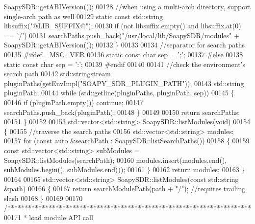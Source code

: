 \begin{DoxyCode}
{      SoapySDR::getABIVersion());
00128         \textcolor{comment}{//when using a multi-arch directory, support single-arch path as well}
00129         \textcolor{keyword}{static} \textcolor{keyword}{const} std::string libsuffix(\textcolor{stringliteral}{"@LIB\_SUFFIX@"});
00130         \textcolor{keywordflow}{if} (not libsuffix.empty() and libsuffix.at(0) == \textcolor{charliteral}{'/'})
00131             searchPaths.push\_back(\textcolor{stringliteral}{"/usr/local/lib/SoapySDR/modules"} + 
      SoapySDR::getABIVersion());
00132     \}
00133 
00134     \textcolor{comment}{//separator for search paths}
00135 \textcolor{preprocessor}{    #ifdef \_MSC\_VER}
00136     \textcolor{keyword}{static} \textcolor{keyword}{const} \textcolor{keywordtype}{char} sep = \textcolor{charliteral}{';'};
00137 \textcolor{preprocessor}{    #else}
00138     \textcolor{keyword}{static} \textcolor{keyword}{const} \textcolor{keywordtype}{char} sep = \textcolor{charliteral}{':'};
00139 \textcolor{preprocessor}{    #endif}
00140 
00141     \textcolor{comment}{//check the environment's search path}
00142     std::stringstream pluginPaths(getEnvImpl(\textcolor{stringliteral}{"SOAPY\_SDR\_PLUGIN\_PATH"}));
00143     std::string pluginPath;
00144     \textcolor{keywordflow}{while} (std::getline(pluginPaths, pluginPath, sep))
00145     \{
00146         \textcolor{keywordflow}{if} (pluginPath.empty()) \textcolor{keywordflow}{continue};
00147         searchPaths.push\_back(pluginPath);
00148     \}
00149 
00150     \textcolor{keywordflow}{return} searchPaths;
00151 \}
00152 
00153 std::vector<std::string> SoapySDR::listModules(\textcolor{keywordtype}{void})
00154 \{
00155     \textcolor{comment}{//traverse the search paths}
00156     std::vector<std::string> modules;
00157     \textcolor{keywordflow}{for} (\textcolor{keyword}{const} \textcolor{keyword}{auto} &searchPath : SoapySDR::listSearchPaths())
00158     \{
00159         \textcolor{keyword}{const} std::vector<std::string> subModules = SoapySDR::listModules(searchPath);
00160         modules.insert(modules.end(), subModules.begin(), subModules.end());
00161     \}
00162     \textcolor{keywordflow}{return} modules;
00163 \}
00164 
00165 std::vector<std::string> SoapySDR::listModules(\textcolor{keyword}{const} std::string &path)
00166 \{
00167     \textcolor{keywordflow}{return} searchModulePath(path + \textcolor{stringliteral}{"/"}); \textcolor{comment}{//requires trailing slash}
00168 \}
00169 
00170 \textcolor{comment}{/***********************************************************************}
00171 \textcolor{comment}{ * load module API call}
}
\end{DoxyCode}

